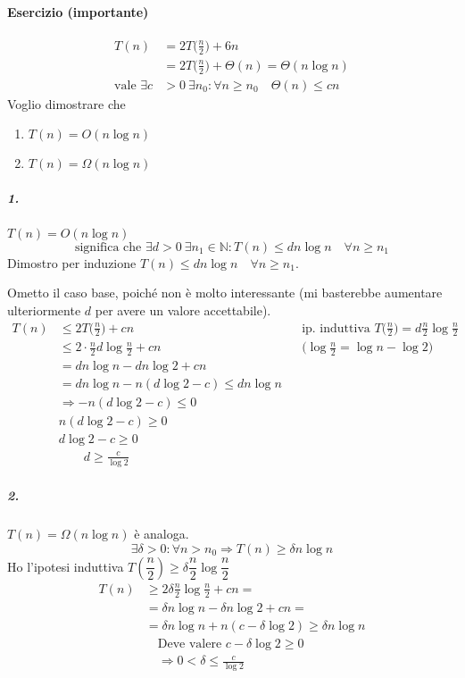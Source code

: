 \paragraph{Esercizio (importante)} 
\begin{align*}
	T(n) & = 2T\Big(\frac{n}{2}\Big) + 6n \\
		& = 2T\Big(\frac{n}{2}\Big) + \Theta (n) = \Theta (n \log n) \\
		\text{vale } \exists c & > 0 \ \exists n_0 : \forall n \geq n_0 \quad \Theta(n) \leq cn
\end{align*}
Voglio dimostrare che 
\begin{enumerate}
	\item $T(n) = O(n \log n)$
	\item $T(n) = \Omega (n \log n)$
\end{enumerate}

\subparagraph{1.} $T(n) = O(n \log n)$
\begin{displaymath}
	\text{significa che } \exists d > 0 \ \exists n_1 \in \mathbb{N} : T(n) \leq dn \log n \quad \forall n \geq n_1
\end{displaymath}
Dimostro per induzione $T(n) \leq dn \log n \quad \forall n \geq n_1$.\par
Ometto il caso base, poiché non è molto interessante (mi basterebbe aumentare ulteriormente $d$ per avere
un valore accettabile).
\begin{align*}
	T(n) & \leq 2T\Big(\frac{n}{2}\Big) + cn && \text{ip. induttiva } T\Big(\frac{n}{2}\Big) = d \frac{n}{2} \log \frac{n}{2} \\
	& \leq 2 \cdot \frac{n}{2} d \log \frac{n}{2} + cn && \Big(\log \frac{n}{2} = \log n - \log 2\Big) \\
	& = dn \log n - dn \log 2 + cn \\
	& = dn \log n - n(d \log 2 - c) \leq dn \log n \\
	& \Rightarrow - n(d \log 2 - c) \leq 0 \\
	& n(d \log 2 - c) \geq 0 \\
	& d \log 2 - c \geq 0 \\
	& \qquad d \geq \frac{c}{\log 2}
\end{align*}

\subparagraph{2.} $T(n) = \Omega (n \log n)$ è analoga.
\[
	\exists \delta > 0 : \forall n > n_0 \Rightarrow T(n) \geq \delta n \log n
\]
Ho l'ipotesi induttiva $T(\dfrac{n}{2}) \geq \delta \dfrac{n}{2} \log \dfrac{n}{2}$
\begin{align*}
	T(n) & \geq 2\delta \frac{n}{2} \log \frac{n}{2} + cn = \\
	& = \delta n \log n - \delta n \log 2 + cn = \\
	& = \delta n \log n + n(c - \delta \log 2) \geq \delta n \log n \\
	& \quad \text{Deve valere } c - \delta \log 2 \geq 0 \\
	& \quad \Rightarrow 0 < \delta \leq \frac{c}{\log 2}
\end{align*}

